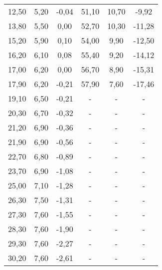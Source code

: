 \begin{table}[htp]
\begin{center}
\begin{tabular}{cccccc}
				12,50  & 5,20 & -0,04 & 51,10 & 10,70& -9,92\\
				13,80  & 5,50 & 0,00  & 52,70 & 10,30& -11,28\\
				15,20  & 5,90 & 0,10  & 54,00 & 9,90 & -12,50\\
				16,20  & 6,10 & 0,08  & 55,40 & 9,20 & -14,12\\
				17,00  & 6,20 & 0,00  & 56,70 & 8,90 & -15,31\\
				17,90  & 6,20 & -0,21 & 57,90 & 7,60 & -17,46\\
				19,10  & 6,50 & -0,21 & -  & - & -\\
				20,30  & 6,70 & -0,32 & -  & - & -\\
				21,20  & 6,90 & -0,36 & -  & - & -\\
				21,90  & 6,90 & -0,56 & -  & - & -\\
				22,70  & 6,80 & -0,89 & -  & - & -\\
				23,70  & 6,90 & -1,08 & -  & - & -\\
				25,00  & 7,10 & -1,28 & -  & - & -\\
				26,30  & 7,50 & -1,31 & -  & - & -\\
				27,30  & 7,60 & -1,55 & -  & - & -\\
				28,30  & 7,60 & -1,90 & -  & - & -\\
				29,30  & 7,60 & -2,27 & -  & - & -\\
				30,20  & 7,60 & -2,61 & -  & - & -\\
      \bottomrule
      \end{tabular}
    \end{center}
  \end{table}


